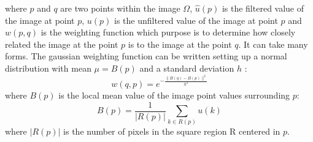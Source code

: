 \documentclass{standalone}
\begin{document}
where $p$ and $q$ are two points within the image $\Omega$, $\hat{u}(p)$ is the filtered value of the image at point $p$, $u(p)$ is the unfiltered value of the image at point $p$ and $w(p, q)$ is the weighting function which purpose is to determine how closely related the image at the point $p$ is to the image at the point $q$.
It can take many forms.
The gaussian weighting function can be written setting up a normal distribution with mean $\mu = B(p)$ and a standard deviation $h$ \cite{nonlocalmeans1}:
\begin{equation}
    w(q, p)= e^{ - \frac{\| B(q) - B(p) \|^2}{h^2}}
\end{equation}
where $B(p)$ is the local mean value of the image point values surrounding $p$:
\begin{equation}
    B(p) = \frac{1}{|R(p)|} \sum_{k \in R(p)}^{} u(k)
\end{equation}
where $|R(p)|$ is the number of pixels in the square region R centered in $p$.
\end{document}

